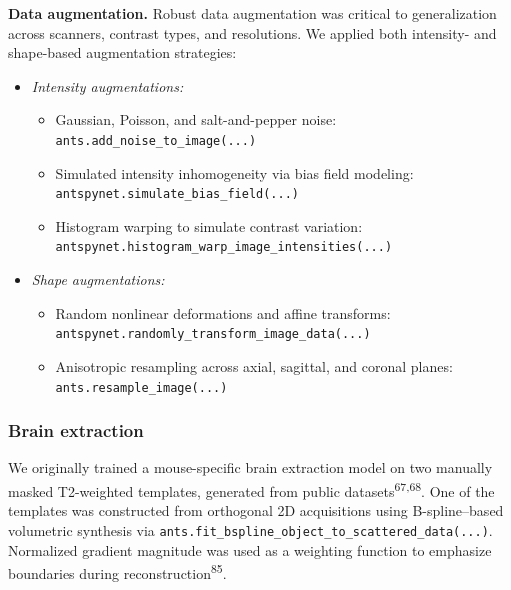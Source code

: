 \documentclass[
  12pt,
]{article}
\providecommand{\tightlist}{%
  \setlength{\itemsep}{0pt}\setlength{\parskip}{0pt}}
\begin{document}
\textbf{Data augmentation.} Robust data augmentation was critical to
generalization across scanners, contrast types, and resolutions. We
applied both intensity- and shape-based augmentation strategies:

\begin{itemize}
\item
  \emph{Intensity augmentations:}

  \begin{itemize}
  \tightlist
  \item
    Gaussian, Poisson, and salt-and-pepper noise:\\
    \texttt{ants.add\_noise\_to\_image(...)}
  \item
    Simulated intensity inhomogeneity via bias field modeling:\\
    \texttt{antspynet.simulate\_bias\_field(...)}
  \item
    Histogram warping to simulate contrast variation:\\
    \texttt{antspynet.histogram\_warp\_image\_intensities(...)}
  \end{itemize}
\item
  \emph{Shape augmentations:}

  \begin{itemize}
  \tightlist
  \item
    Random nonlinear deformations and affine transforms:\\
    \texttt{antspynet.randomly\_transform\_image\_data(...)}
  \item
    Anisotropic resampling across axial, sagittal, and coronal planes:\\
    \texttt{ants.resample\_image(...)}
  \end{itemize}
\end{itemize}

\subsubsection{Brain extraction}\label{brain-extraction}

We originally trained a mouse-specific brain extraction model on two
manually masked T2-weighted templates, generated from public
datasets\textsuperscript{67,68}. One of the templates was constructed
from orthogonal 2D acquisitions using B-spline--based volumetric
synthesis via
\texttt{ants.fit\_bspline\_object\_to\_scattered\_data(...)}. Normalized
gradient magnitude was used as a weighting function to emphasize
boundaries during reconstruction\textsuperscript{85}.
\end{document}
